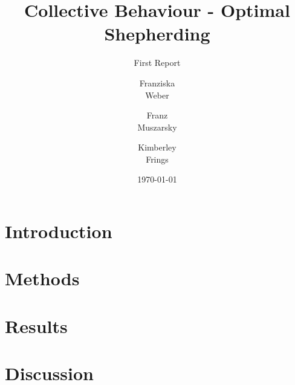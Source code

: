 \documentclass{article}
\title{Collective Behaviour - Optimal Shepherding}
\subtitle{First Report}
\author{Franziska\\Weber \and Franz\\Muszarsky \and Kimberley\\Frings}
\date{\today}
\begin{document}
\maketitle

\section{Introduction}


\section{Methods}
\label{sec:methods}


\section{Results}
\label{sec:results}


\section{Discussion}
\label{sec:discussion}




\end{document}
